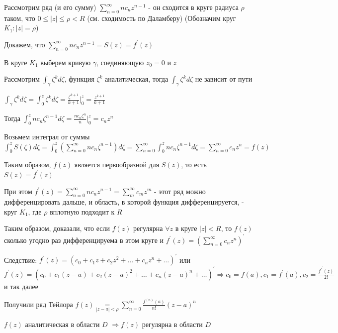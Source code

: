 \documentclass[12pt]{article}
\begin{document}
\begin{MyProof}
    Рассмотрим ряд (и его сумму) $\sum_{n = 0}^\infty n c_n z^{n - 1}$ - он сходится в круге радиуса $\rho$ таком, что $0 \leq |z| \leq \rho < R$
    (см. сходимость по Даламберу) (Обозначим круг $K_1 : |z| = \rho$)

    Докажем, что $\sum_{n = 0}^\infty n c_n z^{n - 1} = S(z) = f^\prime(z)$

    В круге $K_1$ выберем кривую $\gamma$, соединяющую $z_0 = 0$ и $z$

    Рассмотрим $\int_\gamma \zeta^k d \zeta$, функция $\zeta^k$ аналитическая, тогда $\int_\gamma \zeta^k d\zeta$ не зависит от пути 

    $\int_\gamma \zeta^k d\zeta = \int_0^z \zeta^k d\zeta = \frac{\zeta^{k + 1}}{k + 1} \Big|^z_0 = \frac{z^{k + 1}}{k + 1}$

    Тогда $\int_0^z n c_n \zeta^{n - 1} d\zeta = \frac{n c_n \zeta^n}{n} \Big|_0^z = c_n z^n$

    Возьмем интеграл от суммы $\int_0^z S(\zeta) d\zeta = \int_0^z \left(\sum_{n = 0}^\infty n c_n \zeta^{n - 1}\right) d\zeta = 
    \sum_{n = 0}^\infty \int_0^z n c_n \zeta^{n - 1} d\zeta = \sum_{n = 0}^\infty c_n z^n = f(z)$

    Таким образом, $f(z)$ является первообразной для $S(z)$, то есть $S(z) = f^\prime(z)$

    При этом $f^\prime (z) = \sum_{n = 0}^\infty n c_n z^{n - 1} = \sum_{m}^\infty c_m z^m$ - этот ряд
    можно дифференцировать дальше, и область, в которой функция дифференцируется, - круг $K_1$, где $\rho$ вплотную подходит к $R$

    Таким образом, доказали, что если $f(z)$ регулярна $\forall z$ в круге $|z| < R$, то $f(z)$ сколько угодно раз дифференцируема в этом круге и $f^\prime(z) = \left(\sum_{n = 0}^\infty c_n z^n\right)^\prime$
\end{MyProof}

Следствие: $f^\prime(z) = (c_0 + c_1 z + c_2 z^2 + \dots + c_n z^n + \dots)^\prime$ или 
$f^\prime(z) = (c_0 + c_1 (z - a) + c_2 (z - a)^2 + \dots + c_n (z - a)^n + \dots)^\prime \Longrightarrow c_0 = f(a), c_1 = f^\prime(a), c_2 = \frac{f^\prime^\prime(z)}{2!}$ и так далее 

Получили ряд Тейлора $f(z) \underset{|z - a| < \rho}{=} \sum_{n = 0}^\infty \frac{f^{(n)} (a)}{n!} (z - a)^n$

\begin{MyTheorem}
    \Ths $f(z)$ аналитическая в области $D$ $\Longrightarrow f(z)$ регулярна в области $D$
\end{MyTheorem}
\end{document}
